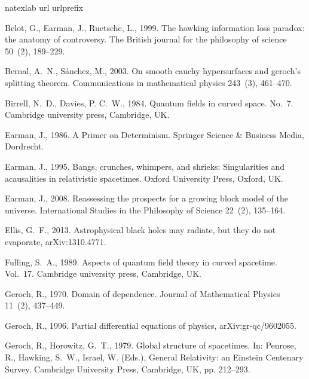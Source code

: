 \documentclass[authoryear,12pt,3p]{jowarticle}
\begin{document}
\begin{thebibliography}{32}
\expandafter\ifx\csname natexlab\endcsname\relax\def\natexlab#1{#1}\fi
\expandafter\ifx\csname url\endcsname\relax
  \def\url#1{\texttt{#1}}\fi
\expandafter\ifx\csname urlprefix\endcsname\relax\def\urlprefix{URL }\fi

Belot, G., Earman, J., Ruetsche, L., 1999. The hawking information loss
  paradox: the anatomy of controversy. The British journal for the philosophy
  of science 50~(2), 189--229.

Bernal, A.~N., S{\'a}nchez, M., 2003. On smooth cauchy hypersurfaces and
  geroch’s splitting theorem. Communications in mathematical physics 243~(3),
  461--470.

Birrell, N.~D., Davies, P. C.~W., 1984. Quantum fields in curved space. No.~7.
  Cambridge university press, Cambridge, UK.

Earman, J., 1986. A Primer on Determinism. Springer Science \& Business Media,
  Dordrecht.

Earman, J., 1995. Bangs, crunches, whimpers, and shrieks: Singularities and
  acausalities in relativistic spacetimes. Oxford University Press, Oxford, UK.

Earman, J., 2008. Reassessing the prospects for a growing block model of the
  universe. International Studies in the Philosophy of Science 22~(2),
  135--164.

Ellis, G.~F., 2013. Astrophysical black holes may radiate, but they do not
  evaporate, arXiv:1310.4771.

Fulling, S.~A., 1989. Aspects of quantum field theory in curved spacetime.
  Vol.~17. Cambridge university press, Cambridge, UK.

Geroch, R., 1970. Domain of dependence. Journal of Mathematical Physics 11~(2),
  437--449.

Geroch, R., 1996. Partial differential equations of physics,
  arXiv:gr-qc/9602055.

Geroch, R., Horowitz, G.~T., 1979. Global structure of spacetimes. In: Penrose,
  R., Hawking, S.~W., Israel, W. (Eds.), General Relativity: an Einstein
  Centenary Survey. Cambridge University Press, Cambridge, UK, pp. 212--293.


\end{thebibliography}
\end{document}
